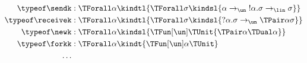 %
\begin{align*}
  \typeof \sendk &: \TForall\alpha\kindtl{\TForall\sigma\kindsl {\alpha \to_{\un} {!\alpha}. \sigma \to_{\lin} \sigma}}
  \\
  \typeof \receivek &: \TForall\alpha\kindtl{\TForall\sigma\kindsl
                      {?\alpha. \sigma \to_{\un} \TPair\alpha\sigma}}
  \\
  \typeof \newk & : \TForall\alpha\kindsl
                  {\TFun[\un]\TUnit{\TPair\alpha{\TDual \alpha}}}
                  \\
  \typeof \forkk & : \TForall\alpha\kindt
                  {\TFun[\un]\alpha{\TUnit}}
  \\ \dots
\end{align*}


